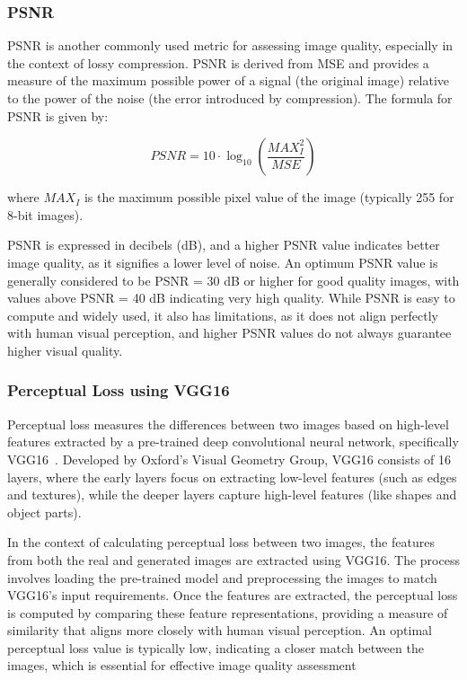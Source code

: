 \documentclass[12pt,DIV14,BCOR12mm,a4paper,footinclude=false,headinclude,parskip=half-,twoside,openright,cleardoublepage=empty,toc=index,bibliography=totoc,listof=totoc]{scrreprt}
\numberwithin{equation}{chapter}
\begin{document}
\subsubsection{PSNR}
PSNR is another commonly used metric for assessing image quality, especially in the context of lossy compression. PSNR is derived from MSE and provides a measure of the maximum possible power of a signal (the original image) relative to the power of the noise (the error introduced by compression). The formula for PSNR is given by:

\begin{equation}
PSNR = 10 \cdot \log_{10}\left(\frac{MAX_I^2}{MSE}\right)
\end{equation}

where \( MAX_I \) is the maximum possible pixel value of the image (typically 255 for 8-bit images).

PSNR is expressed in decibels (dB), and a higher PSNR value indicates better image quality, as it signifies a lower level of noise. An optimum PSNR value is generally considered to be PSNR = 30 dB or higher for good quality images, with values above PSNR = 40 dB indicating very high quality. While PSNR is easy to compute and widely used, it also has limitations, as it does not align perfectly with human visual perception, and higher PSNR values do not always guarantee higher visual quality.

\subsubsection{Perceptual Loss using VGG16}
Perceptual loss measures the differences between two images based on high-level features extracted by a pre-trained deep convolutional neural network, specifically VGG16~\cite{VGG16}. Developed by Oxford's Visual Geometry Group, VGG16 consists of 16 layers, where the early layers focus on extracting low-level features (such as edges and textures), while the deeper layers capture high-level features (like shapes and object parts).

In the context of calculating perceptual loss between two images, the features from both the real and generated images are extracted using VGG16. The process involves loading the pre-trained model and preprocessing the images to match VGG16's input requirements. Once the features are extracted, the perceptual loss is computed by comparing these feature representations, providing a measure of similarity that aligns more closely with human visual perception. An optimal perceptual loss value is typically low, indicating a closer match between the images, which is essential for effective image quality assessment
\end{document}
